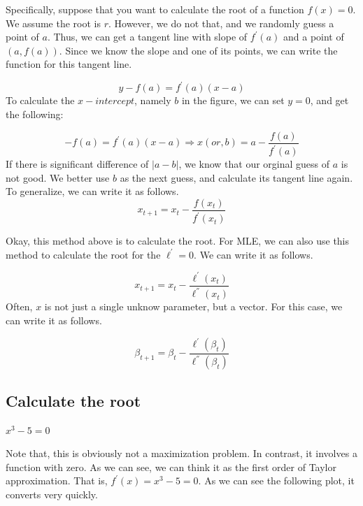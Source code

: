 \documentclass[]{book}
\begin{document}
Specifically, suppose that you want to calculate the root of a function
\(f(x)=0\). We assume the root is \(r\). However, we do not that, and we
randomly guess a point of \(a\). Thus, we can get a tangent line with
slope of \(f^{'}(a)\) and a point of \((a,f(a))\). Since we know the
slope and one of its points, we can write the function for this tangent
line.

\[y-f(a)=f^{'}(a)(x-a)\] To calculate the \(x-intercept\), namely \(b\)
in the figure, we can set \(y=0\), and get the following:

\[-f(a)=f^{'}(a)(x-a) \Rightarrow x (or, b)= a-\frac{f(a)}{f^{'}(a)}\]
If there is significant difference of \(|a-b|\), we know that our
orginal guess of \(a\) is not good. We better use \(b\) as the next
guess, and calculate its tangent line again. To generalize, we can write
it as follows. \[x_{t+1}=x_{t}-\frac{f(x_t)}{f^{'}(x_t)}\]

Okay, this method above is to calculate the root. For MLE, we can also
use this method to calculate the root for the \(\ell ^{'}=0\). We can
write it as follows.

\[x_{t+1}=x_{t}-\frac{\ell^{'}(x_t)}{\ell^{''}(x_t)}\] Often, \(x\) is
not just a single unknow parameter, but a vector. For this case, we can
write it as follows.

\[\beta_{t+1}=\beta_{t}-\frac{\ell^{'}(\beta_t)}{\ell^{''}(\beta_t)}\]

\subsection{Calculate the root}\label{calculate-the-root}

\(x^3-5=0\)

Note that, this is obviously not a maximization problem. In contrast, it
involves a function with zero. As we can see, we can think it as the
first order of Taylor approximation. That is, \(f^{'}(x)=x^3-5=0\). As
we can see the following plot, it converts very quickly.
\end{document}
